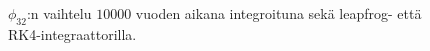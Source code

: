 \documentclass[12pt,a4paper,titlepage]{article}
\begin{document}
\begin{figure}[h!]
\begin{subfigure}[b]{0.8\textwidth}
    \end{subfigure}
    \caption{$\phi_{32}$:n vaihtelu $10 000$ vuoden aikana integroituna sekä leapfrog- että RK4-integraattorilla.}\label{shortrun-phis}
\end{figure}
\end{document}
